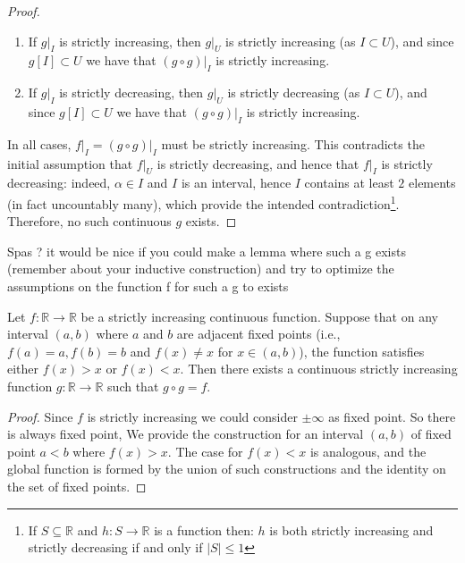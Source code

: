 \begin{solution}
\begin{proof}
\begin{enumerate}
            \item If \( \left. g \right|_{I} \) is strictly increasing, then \( \left. g \right|_{U} \) is strictly increasing (as \( I\subset U \)), and since \( g\left[I\right] \subset U \) we have that \( \left. \left( g \circ g \right) \right|_{I} \) is strictly increasing.
            \item If \( \left. g \right|_{I} \) is strictly decreasing, then \( \left. g \right|_{U} \) is strictly decreasing (as \( I\subset U \)), and since \( g\left[I\right] \subset U \) we have that \( \left. \left( g \circ g \right) \right|_{I} \) is strictly increasing.
        \end{enumerate}
        In all cases, \( \left. f \right|_{I} = \left. \left( g \circ g \right) \right|_{I} \) must be strictly increasing. This contradicts the initial assumption that \( \left. f \right|_{U} \) is strictly decreasing, and hence that \( \left. f \right|_{I} \) is strictly decreasing: indeed, \( \alpha \in I \) and \( I \) is an interval, hence \( I \) contains at least \( 2 \) elements (in fact uncountably many), which provide the intended contradiction\footnote{If \( S \subseteq \mathbb{R} \) and \( h : S \to \mathbb{R} \) is a function then: \( h \) is both strictly increasing and strictly decreasing if and only if \( \left\lvert S \right\rvert \leq 1 \)}. Therefore, no such continuous \( g \) exists.
    \end{proof}

    \begin{lemma}
        Spas ? it would be nice if you could make a lemma where such a g exists (remember about your inductive construction) and try to optimize the assumptions on the function f for such a g to exists
    \end{lemma}

    \begin{lemma}
        Let \( f: \mathbb{R} \to \mathbb{R} \) be a strictly increasing continuous function. Suppose that on any interval \( \left(a, b\right) \) where \( a \) and \( b \) are adjacent fixed points (i.e., \( f\left(a\right)=a, f\left(b\right)=b \) and \( f\left(x\right) \neq x \) for \( x \in \left(a, b\right) \)), the function satisfies either \( f\left(x\right) > x \) or \( f\left(x\right) < x \). Then there exists a continuous strictly increasing function \( g: \mathbb{R} \to \mathbb{R} \) such that \( g \circ g = f \).
    \end{lemma}

    \begin{proof}
        Since \( f \) is strictly increasing we could consider \( \pm \infty \) as fixed point. So there is always fixed point, We provide the construction for an interval \( \left(a, b\right) \) of fixed point \( a<b \) where \( f\left(x\right) > x \). The case for \( f\left(x\right) < x \) is analogous, and the global function is formed by the union of such constructions and the identity on the set of fixed points.


\end{proof}
\end{solution}
